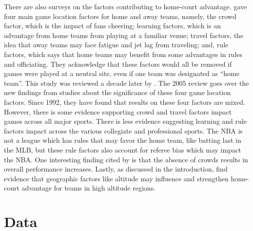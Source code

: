 \documentclass[10pt]{article}
\begin{document}
There are also surveys on the factors contributing to home-court advantage.
\citet{Carron1992} gave four main game location factors for home and away
teams, namely, the crowd factor, which is the impact of fans cheering; learning
factors, which is an advantage from home teams from playing at
a familiar venue; travel factors, the idea that away teams may face
fatigue and jet lag from traveling; and, rule factors, which says that home teams
may benefit from some advantages in rules and officiating. They acknowledge that
these factors would all be removed if games were played at a neutral site, even
if one team was designated as ``home team''. This study was reviewed a decade later
by \citet{Carron2005}. The 2005 review goes over the new findings from studies
about the significance of these four game location factors. Since 1992, they have found
that results on these four factors are mixed. However, there is some evidence
supporting crowd and travel factors impact games across all major sports. There is less
evidence suggesting learning and rule factors impact across the various collegiate 
and professional sports. The NBA is not a league which has rules that
may favor the home team, like batting last in the MLB, but these rule
factors also account for referee bias which may impact the NBA.  One
interesting
finding cited by \citet{Carron2005} is that the absence of crowds results
in overall performance increases. Lastly, as discussed in the introduction, \citet{Lopez}
find evidence that geographic factors like altitude may influence and strengthen home-court
advantage for teams in high altitude regions.

\section{Data}
\end{document}
